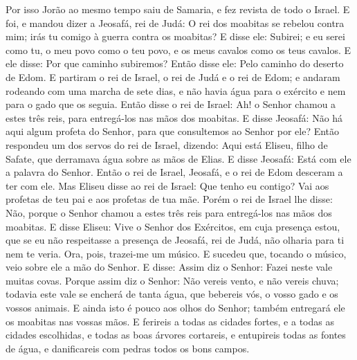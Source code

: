 Por isso Jorão ao mesmo tempo saiu de Samaria, e fez revista de
todo o Israel. E foi, e mandou dizer a Jeosafá, rei de Judá: O
rei dos moabitas se rebelou contra mim; irás tu comigo à guerra
contra os moabitas? E disse ele: Subirei; e eu serei como tu, o meu
povo como o teu povo, e os meus cavalos como os teus cavalos. E
ele disse: Por que caminho subiremos? Então disse ele: Pelo caminho
do deserto de Edom. E partiram o rei de Israel, o rei de Judá e
o rei de Edom; e andaram rodeando com uma marcha de sete dias, e não
havia água para o exército e nem para o gado que os seguia.
Então disse o rei de Israel: Ah! o Senhor chamou a estes três
reis, para entregá-los nas mãos dos moabitas. E disse
Jeosafá: Não há aqui algum profeta do Senhor, para que consultemos
ao Senhor por ele? Então respondeu um dos servos do rei de Israel,
dizendo: Aqui está Eliseu, filho de Safate, que derramava água sobre
as mãos de Elias. E disse Jeosafá: Está com ele a palavra do
Senhor. Então o rei de Israel, Jeosafá, e o rei de Edom desceram a
ter com ele. Mas Eliseu disse ao rei de Israel: Que tenho eu
contigo? Vai aos profetas de teu pai e aos profetas de tua mãe.
Porém o rei de Israel lhe disse: Não, porque o Senhor chamou a estes
três reis para entregá-los nas mãos dos moabitas. E disse
Eliseu: Vive o Senhor dos Exércitos, em cuja presença estou, que se
eu não respeitasse a presença de Jeosafá, rei de Judá, não olharia
para ti nem te veria. Ora, pois, trazei-me um músico. E
sucedeu que, tocando o músico, veio sobre ele a mão do Senhor.
E disse: Assim diz o Senhor: Fazei neste vale muitas covas.
Porque assim diz o Senhor: Não vereis vento, e não vereis
chuva; todavia este vale se encherá de tanta água, que bebereis vós,
o vosso gado e os vossos animais. E ainda isto é pouco aos
olhos do Senhor; também entregará ele os moabitas nas vossas mãos.
E ferireis a todas as cidades fortes, e a todas as cidades
escolhidas, e todas as boas árvores cortareis, e entupireis todas as
fontes de água, e danificareis com pedras todos os bons campos.

